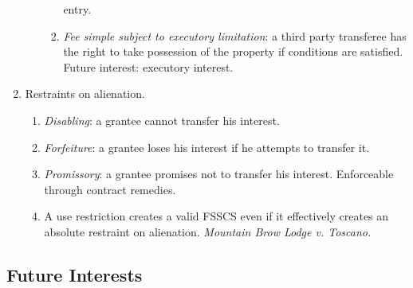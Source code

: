 \begin{enumerate}
\begin{enumerate}
\begin{enumerate}
            entry.
            \item \emph{Fee simple subject to executory limitation}: a third 
            party transferee has the right to take possession of the property 
            if conditions are satisfied. Future interest: executory interest.
        \end{enumerate}
    \end{enumerate}
    \item Restraints on alienation.
    \begin{enumerate}
        \item \emph{Disabling}: a grantee cannot transfer his interest.
        \item \emph{Forfeiture}: a grantee loses his interest if he attempts 
        to transfer it.
        \item \emph{Promissory}: a grantee promises not to transfer his 
        interest. Enforceable through contract remedies.
        \item A use restriction creates a valid FSSCS even if it effectively 
        creates an absolute restraint on alienation. \emph{Mountain Brow Lodge 
        v. Toscano.}
    \end{enumerate}
\end{enumerate}

\subsection{Future Interests}

